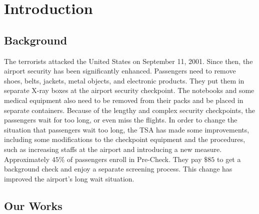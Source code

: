 \documentclass{mcmthesis}
\begin{document}
\section{Introduction}

\subsection{Background}
\par The terrorists attacked the United States on September 11, 2001. Since then, the airport security has been significantly enhanced. Passengers need to remove shoes, belts, jackets, metal objects, and electronic products. They put them in separate X-ray boxes at the airport security checkpoint. The notebooks and some medical equipment also need to be removed from their packs and be placed in separate containers. Because of the lengthy and complex security checkpoints, the passengers wait for too long, or even miss the flights. In order to change the situation that passengers wait too long, the TSA has made some improvements, including some modifications to the checkpoint equipment and the procedures, such as increasing staffs at the airport and introducing a new measure. Approximately $45\%$ of passengers enroll in Pre-Check. They pay $\$85$ to get a background check and enjoy a separate screening process. This change has improved the airport's long wait situation.

\subsection{Our Works}
\end{document}
